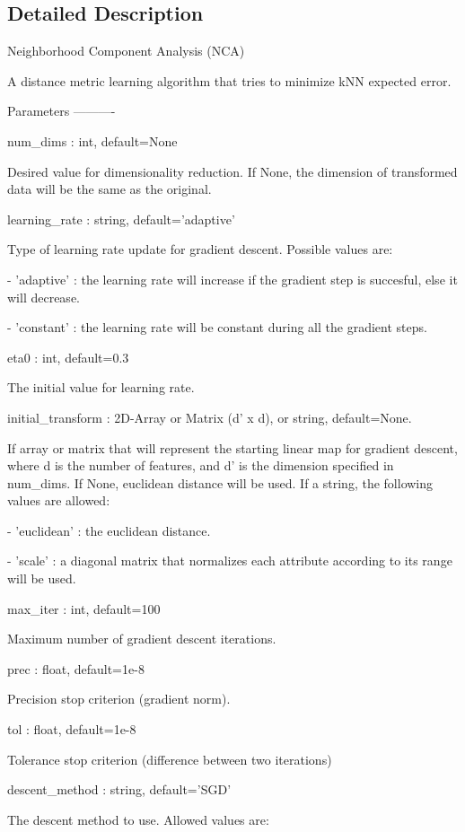 \subsection{Detailed Description}
\begin{DoxyVerb}Neighborhood Component Analysis (NCA)

A distance metric learning algorithm that tries to minimize kNN expected error.

Parameters
----------

num_dims : int, default=None

    Desired value for dimensionality reduction. If None, the dimension of transformed data will be the same as the original.

learning_rate : string, default='adaptive'

    Type of learning rate update for gradient descent. Possible values are:

    - 'adaptive' : the learning rate will increase if the gradient step is succesful, else it will decrease.

    - 'constant' : the learning rate will be constant during all the gradient steps.

eta0 : int, default=0.3

    The initial value for learning rate.

initial_transform : 2D-Array or Matrix (d' x d), or string, default=None.

    If array or matrix that will represent the starting linear map for gradient descent, where d is the number of features,
    and d' is the dimension specified in num_dims.
    If None, euclidean distance will be used. If a string, the following values are allowed:

    - 'euclidean' : the euclidean distance.

    - 'scale' : a diagonal matrix that normalizes each attribute according to its range will be used.

max_iter : int, default=100

    Maximum number of gradient descent iterations.

prec : float, default=1e-8

    Precision stop criterion (gradient norm).

tol : float, default=1e-8

    Tolerance stop criterion (difference between two iterations)

descent_method : string, default='SGD'

    The descent method to use. Allowed values are:


\end{DoxyVerb}
